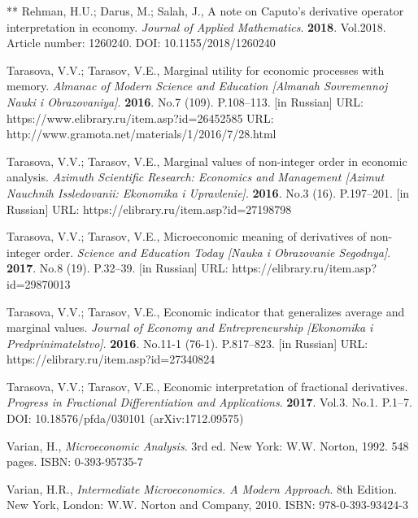 \documentclass[12pt]{article}
\begin{document}
\begin{thebibliography}{**}
 Rehman, H.U.; Darus, M.; Salah, J.,
A note on Caputo's derivative operator interpretation in economy.
\textit{Journal of Applied Mathematics}.
\textbf{2018}. Vol.2018. Article number: 1260240.
DOI: 10.1155/2018/1260240




 Tarasova, V.V.; Tarasov, V.E., 
Marginal utility for economic processes with memory. 
\textit{Almanac of Modern Science and Education [Almanah Sovremennoj Nauki i Obrazovaniya]}. \textbf{2016}. No.7 (109). P.108--113. [in Russian] 
URL: https://www.elibrary.ru/item.asp?id=26452585
URL: http://www.gramota.net/materials/1/2016/7/28.html

 Tarasova, V.V.; Tarasov, V.E., 
Marginal values of non-integer order in economic analysis. 
\textit{Azimuth Scientific Research: Economics and Management [Azimut Nauchnih Issledovanii: Ekonomika i Upravlenie]}. 
\textbf{2016}. No.3 (16). P.197--201. [in Russian] URL: https://elibrary.ru/item.asp?id=27198798

 Tarasova, V.V.; Tarasov, V.E., 
Microeconomic meaning of derivatives of non-integer order. 
\textit{Science and Education Today [Nauka i Obrazovanie Segodnya]}. \textbf{2017}. No.8 (19). P.32--39. [in Russian] 
URL: https://elibrary.ru/item.asp?id=29870013

 Tarasova, V.V.; Tarasov, V.E., 
Economic indicator that generalizes average and marginal values. 
\textit{Journal of Economy and Entrepreneurship [Ekonomika i Predprinimatelstvo]}. 
\textbf{2016}. No.11-1 (76-1). P.817--823. [in Russian] URL: https://elibrary.ru/item.asp?id=27340824

 Tarasova, V.V.; Tarasov, V.E., 
Economic interpretation of fractional derivatives. 
\textit{Progress in Fractional Differentiation and Applications}. \textbf{2017}. Vol.3. No.1. P.1--7. DOI: 10.18576/pfda/030101 (arXiv:1712.09575)


 Varian, H., 
\textit{Microeconomic Analysis}. 3rd ed. New York: W.W. Norton, 1992. 548 pages. ISBN: 0-393-95735-7

 Varian, H.R., 
\textit{Intermediate Microeconomics. A Modern Approach}. 8th Edition. New York, London: W.W. Norton and Company, 2010. ISBN: 978-0-393-93424-3


\end{thebibliography}
\end{document}
